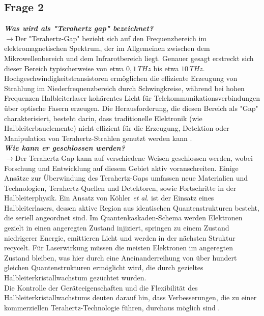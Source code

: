 \subsection{\label{subsec:FZV2}Frage 2}
\textbf{\textit{Was wird als "Terahertz gap" bezeichnet?}}\\
$\rightarrow$Der "Terahertz-Gap" bezieht sich auf den Frequenzbereich im elektromagnetischen Spektrum, 
der im Allgemeinen zwischen dem Mikrowellenbereich und dem Infrarotbereich liegt. 
Genauer gesagt erstreckt sich dieser Bereich typischerweise von 
etwa $0,1\,\si{THz}$ bis etwa $10\,\si{THz}$.
Hochgeschwindigkeitstransistoren ermöglichen die effiziente Erzeugung von Strahlung im 
Niederfrequenzbereich durch Schwingkreise, während bei hohen Frequenzen Halbleiterlaser 
kohärentes Licht für Telekommunikationsverbindungen über optische Fasern erzeugen.
Die Herausforderung, die diesen Bereich als "Gap" charakterisiert, besteht darin, 
dass traditionelle Elektronik (wie Halbleiterbauelemente) nicht effizient für die Erzeugung, 
Detektion oder Manipulation von Terahertz-Strahlen genutzt werden kann \cite{Gap}. \\ 

\textbf{\textit{Wie kann er geschlossen werden?}}\\
$\rightarrow$Der Terahertz-Gap kann auf verschiedene Weisen geschlossen werden, 
wobei Forschung und Entwicklung auf diesem Gebiet aktiv voranschreiten. 
Einige Ansätze zur Überwindung des Terahertz-Gaps umfassen neue Materialien und Technologien,
Terahertz-Quellen und Detektoren, sowie Fortschritte in der Halbleiterphysik. 
Ein Ansatz von Köhler \textit{et al.} \cite{Kohler} ist der Einsatz eines Halbleiterlasers,
dessen aktive Region aus identischen Quantenstrukturen besteht, die seriell angeordnet sind. 
Im Quantenkaskaden-Schema werden Elektronen gezielt in einen angeregten Zustand injiziert, 
springen zu einem Zustand niedrigerer Energie, emittieren Licht und werden in der 
nächsten Struktur recycelt. Für Laserwirkung müssen die meisten Elektronen im angeregten Zustand bleiben, 
was hier durch eine Aneinanderreihung von über hundert gleichen Quantenstrukturen ermöglicht wird, 
die durch gezieltes Halbleiterkristallwachstum gezüchtet wurden. \\
Die Kontrolle der Geräteeigenschaften und die Flexibilität des Halbleiterkristallwachstums 
deuten darauf hin, dass Verbesserungen, die zu einer kommerziellen Terahertz-Technologie führen, 
durchaus möglich sind \cite{Gap}. \\

